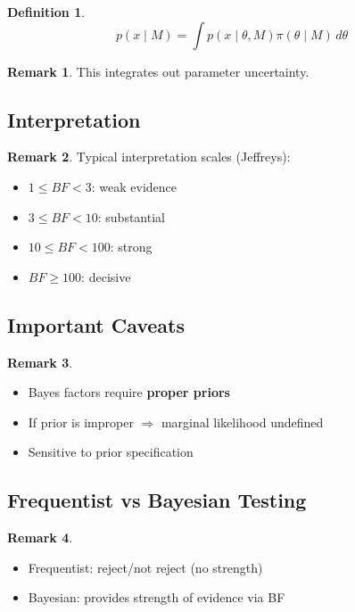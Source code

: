 \documentclass[12pt,oneside]{book}
\numberwithin{equation}{section}
\theoremstyle{definition}
\newtheorem{definition}{Definition}[section]
\newtheorem{remark}{Remark}[section]
\theoremstyle{plain}
\theoremstyle{remark}
\begin{document}
\begin{definition}
$$
p(x \mid M)
=
\int p(x \mid \theta, M)\pi(\theta \mid M)\, d\theta
$$
\end{definition}

\begin{remark}
This integrates out parameter uncertainty.
\end{remark}

\subsection{Interpretation}

\begin{remark}
Typical interpretation scales (Jeffreys):

\begin{itemize}
\item $1 \le BF < 3$: weak evidence
\item $3 \le BF < 10$: substantial
\item $10 \le BF < 100$: strong
\item $BF \ge 100$: decisive
\end{itemize}
\end{remark}


\subsection{Important Caveats}

\begin{remark}
\begin{itemize}
\item Bayes factors require \textbf{proper priors}
\item If prior is improper $\Rightarrow$ marginal likelihood undefined
\item Sensitive to prior specification
\end{itemize}
\end{remark}

\subsection{Frequentist vs Bayesian Testing}

\begin{remark}
\begin{itemize}
\item Frequentist: reject/not reject (no strength)
\item Bayesian: provides strength of evidence via BF
\end{itemize}
\end{remark}
\end{document}

